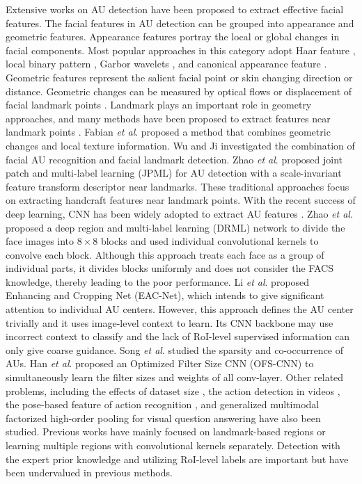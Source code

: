 \documentclass[5p,twocolumn]{elsarticle}
\newcommand{\etal}{\textit{et al}. }
\begin{document}
Extensive works on AU detection have been proposed to extract effective facial features. The facial features in AU detection can be grouped into appearance and geometric features. Appearance features portray the local or global changes in facial components. Most popular approaches in this category adopt Haar feature \cite{whitehill2006haar}, local binary pattern \cite{jiang2011action}, Garbor wavelets \cite{bazzo2004recognizing,valstar2006fully}, and canonical appearance feature \cite{lucey2010extended}. Geometric features represent the salient facial point or skin changing direction or distance. Geometric changes can be measured by optical flows \cite{lien2000detection} or displacement of facial landmark points \cite{valstar2012fully,lucey2010extended}. Landmark plays an important role in geometry approaches, and many methods have been proposed to extract features near landmark points \cite{eleftheriadis2015multi,koelstra2010dynamic,wang2013capturing,chu2013selective,ding2013facial,zeng2015confidence,liu2013aware,valstar2015fera, yu2018rethining}. Fabian \etal \cite{fabian2016emotionet} proposed a method that combines geometric changes and local texture information. Wu and Ji \cite{Wu2016} investigated the combination of facial AU recognition and facial landmark detection. Zhao \etal \cite{Zhao2016} proposed joint patch and multi-label learning (JPML) for AU detection with a scale-invariant feature transform descriptor near landmarks. These traditional approaches focus on extracting handcraft features near landmark points. With the recent success of deep learning, CNN has been widely adopted to extract AU features \cite{han2017optimizing}. Zhao \etal \cite{Zhao2016b} proposed a deep region and multi-label learning (DRML) network to divide the face images into $8\times 8$ blocks and used individual convolutional kernels to convolve each block. Although this approach treats each face as a group of individual parts, it divides blocks uniformly and does not consider the FACS knowledge, thereby leading to the poor performance.
Li \etal \cite{li2017eac} proposed Enhancing and Cropping Net (EAC-Net), which intends to give significant attention to individual AU centers. However, this approach defines the AU center trivially and it uses image-level context to learn. Its CNN backbone may use incorrect context to classify and the lack of RoI-level supervised information can only give coarse guidance. Song \etal \cite{song2015exploiting} studied the sparsity and co-occurrence of AUs. Han \etal \cite{han2017optimizing} proposed an Optimized Filter Size CNN (OFS-CNN) to simultaneously learn the filter sizes and weights of all conv-layer.
Other related problems, including the effects of dataset size \cite{girard2015much}, the action detection in videos \cite{hou2017tube}, the pose-based feature of action recognition \cite{cheron2015p}, and generalized multimodal factorized high-order pooling for visual question answering \cite{yu2018beyond} have also been studied. Previous works have mainly focused on landmark-based regions or learning multiple regions with convolutional kernels separately. Detection with the expert prior knowledge and utilizing RoI-level labels are important but have been undervalued in previous methods.
\end{document}
